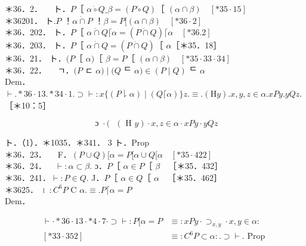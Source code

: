 \documentclass[10pt]{article}
\begin{document}
＊36．2．$\quad$ ト．$P$［ $\alpha \dot{\circ} Q \_\beta=(P \dot{\circ} Q)$［ $(\alpha \cap \beta) \quad[* 35 \cdot 15]$\\
＊36201． ト.$P$ ！$\alpha \dot{\cap} P$ ！$\beta=P[(\alpha \cap \beta) \quad[* 36 \cdot 2]$\\
＊36．202． ト．$P$［ $\alpha \dot{\cap} Q\lceil\alpha=(P \dot{\cap} Q)\lceil\alpha \quad[* 36.2]$\\
＊36．203． ト．$P$［ $\alpha \dot{\cap} Q=(P \dot{\cap} Q)$［ $\alpha$［＊35．18］\\
＊36．21． ト．$(P$［ $\alpha)$［ $\beta=P$［ $(\alpha \cap \beta) \quad[* 35 \cdot 33 \cdot 34]$\\
＊36．22．$\quad$ ㄱ．$(P$ ㄷ $\alpha) \mid(Q$ ᄃ $\alpha) \in(P \mid Q)$ ᄃ $\alpha$\\
Dem．\\
$\vdash . * 36 \cdot 13 . * 34 \cdot 1 . \supset \vdash: x\{(P \downharpoonright \alpha) \mid(Q\lceil\alpha)\} z . \equiv .(\mathrm{H} y) . x, y, z \in \alpha . x P y . y Q z$.\\
［＊10：5］


\begin{equation*}
\text { ɔ } \cdot(\text { }(\text { H } y) \cdot x, z \in \alpha \cdot x P y \cdot y Q z \tag{1}
\end{equation*}


ト．（1）．＊1035．＊341． 3 ト．Prop\\
＊36．23．$\quad$ F．$(P \cup Q)[\alpha=P[\alpha \cup Q[\alpha \quad[* 35 \cdot 422]$\\
＊36．24．$\quad \vdash: \alpha \subset \beta$. ɔ．$P$［ $\alpha \in P$［ $\beta \quad$［＊35．432］\\
＊36．241．$\vdash: P \in Q$. J．$P$［ $\alpha \in Q$［ $\alpha \quad$［＊35．462］\\
＊3625． । $: C^{6} P$ C $\alpha . \equiv . P\lceil\alpha=P$\\
Dem．

$$
\begin{aligned}
\vdash \cdot * 36 \cdot 13 \cdot * 4 \cdot 7 \cdot \supset \vdash: P[\alpha=P & \equiv: x P y \cdot \supset_{x, y} \cdot x, y \in \alpha: \\
{[* 33 \cdot 352] } & \equiv: C^{6} P \subset \alpha: . \supset \vdash . \text { Prop }
\end{aligned}
$$
\end{document}
